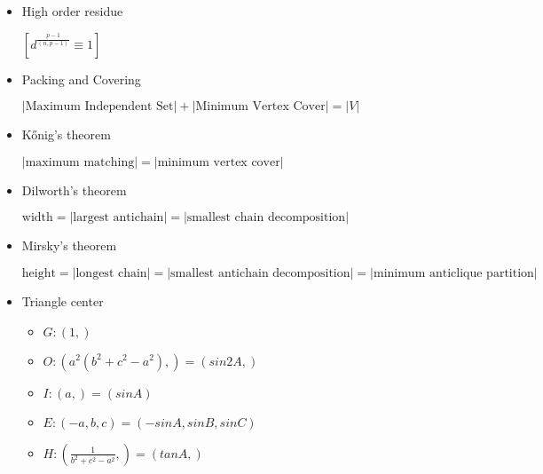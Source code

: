 \begin{itemize}
  \item High order residue

  $[d^{\frac{p-1}{(n,p-1)}}\equiv 1]$

  \item Packing and Covering

  $|\mbox{Maximum Independent Set}| + |\mbox{Minimum Vertex Cover}| = |V|$

  \item Kőnig's theorem

  $|\mbox{maximum matching}| = |\mbox{minimum vertex cover}|$

  \item Dilworth's theorem

  $\mbox{width} = |\mbox{largest antichain}| = |\mbox{smallest chain decomposition}|$

  \item Mirsky's theorem

  $\mbox{height} = |\mbox{longest chain}| = |\mbox{smallest antichain decomposition}| = |\mbox{minimum anticlique partition}|$

  \item Triangle center
  
  \begin{itemize}
  \item $G : (1,)$
  \item $O : (a^2(b^2+c^2-a^2),)=(sin2A,)$
  \item $I : (a,)=(sinA)$
  \item $E : (-a, b, c)=(-sinA, sinB, sinC)$
  \item $H : (\frac{1}{b^2+c^2-a^2},)=(tanA,)$
  \end{itemize}


\end{itemize}
